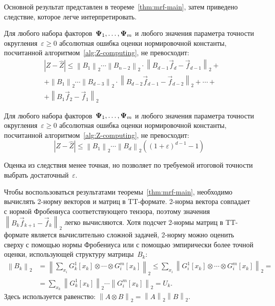 Основной результат представлен в теореме~\ref{thm:mrf-main}, затем приведено следствие, которое легче интерпретировать.
\begin{theorem}
\label{thm:mrf-main}
	Для любого набора факторов~$\boldsymbol{\Psi}_1, \ldots, \boldsymbol{\Psi}_m$ и любого значения параметра точности округления~$\varepsilon \geq 0$ абсолютная ошибка оценки нормировочной константы, посчитанной алгоритмом~\ref{alg:Z-computing}, не превосходит:
	\begin{equation}
	\begin{aligned}
	\label{tough-abs-err-bound}
	&\left |Z - \widehat{Z}  \right | \leq
	\left \| B_1 \right \|_2 \dotsm \left \| B_{n-2} \right \|_2 \cdot \left \| B_{d-1} \vec{f}_d - \vec{f}_{d-1} \right \|_2 + \\
	&+\left \| B_1 \right \|_2 \dotsm \left \| B_{d-3} \right \|_2 \cdot \left \| B_{d-2} \vec{f}_{d-1} - \vec{f}_{d-2} \right \|_2 + \dotsb + \\
	&+\left \| B_1 \vec{f}_2 - \vec{f}_1 \right \|_2
	\end{aligned}
	\end{equation}
\end{theorem}

\begin{corollary}
\label{thm:mrf-corollary}
	Для любого набора факторов~$\boldsymbol{\Psi}_1, \ldots, \boldsymbol{\Psi}_m$ и любого значения параметра точности округления~$\varepsilon \geq 0$ абсолютная ошибка оценки нормировочной константы, посчитанной алгоритмом~\ref{alg:Z-computing}, не превосходит:
	\begin{equation}
		\label{epsilon-inequality}
		\left |Z - \widehat{Z}\right |  \leq \left \| B_1 \right \|_2 \dotsm \left \| B_d \right \|_2 ((1 + \varepsilon)^{d-1} - 1)
	\end{equation}
\end{corollary}
Оценка из следствия менее точная, но позволяет по требуемой итоговой точности выбрать достаточный~$\varepsilon$.

Чтобы воспользоваться результатами теоремы~\ref{thm:mrf-main}, необходимо вычислять 2-норму векторов и матриц в TT\hyp{}формате. 2-норма вектора совпадает с нормой Фробениуса соответствующего тензора, поэтому значения~$\left \| B_k \vec{f}_{k + 1} - \vec{f}_k \right \|_2$ легко вычисляются. Хотя подсчет 2-нормы матриц в TT\hyp{}формате является вычислительно сложной задачей, 2-норму можно оценить сверху с помощью нормы Фробениуса или с помощью эмпирически более точной оценки, использующей структуру матрицы~$B_k$:
\begin{equation}
\label{eq:l2computing}
\begin{aligned}
\left \| B_k \right \|_2 &= \left \| \sum_{x_i} G_k^1 [x_k] \otimes \dotsb \otimes G_i^m [x_k] \right \|_2 \leq
 \sum_{x_i} \left \| G_i^1 [x_k] \otimes \dotsb \otimes G_i^m [x_k] \right \|_2 =\\
& = \sum_{x_k} \left \| G_k^1 [x_k] \right \|_2 \dotsm \left \| G_i^m [x_k] \right \|_2=U_k.
\end{aligned}
\end{equation}
Здесь используется равенство: $\left \| A \otimes B \right \|_2 = \left \| A \right \|_2 \left \| B \right \|_2$.

